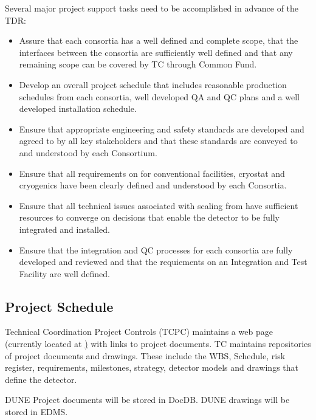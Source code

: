 Several major project support tasks need to be accomplished in advance
of the TDR:
\begin{itemize}
  \item Assure that each consortia has a well defined
and complete scope, that the interfaces between the consortia are
sufficiently well defined and that any remaining scope can be covered
by TC through Common Fund.
  \item Develop an overall project schedule that includes reasonable
production schedules from each consortia, well developed QA and QC
plans and a well developed installation schedule.
  \item Ensure that appropriate engineering and safety standards are
developed and agreed to by all key stakeholders and that these
standards are conveyed to and understood by each Consortium.
  \item Ensure that all  requirements on  for
conventional facilities, cryostat and cryogenics have been clearly
defined and understood by each Consortia.
  \item Ensure that all technical issues associated with scaling from
 have sufficient resources to converge on decisions that
enable the detector to be fully integrated and installed.
  \item Ensure that the integration and QC processes for each
consortia are fully developed and reviewed and that the requiements on
an Integration and Test Facility are well defined.
\end{itemize}

\subsection{Project Schedule}
\label{sec:fdsp-coord-controls}

Technical Coordination Project Controls (TCPC) maintains a web page
(currently located at
\href{https://web.fnal.gov/collaboration/DUNE/DUNE\%20Project/\_layouts/15/start.aspx\#/})
with links to project documents. TC maintains repositories of project
documents and drawings. These include the WBS, Schedule, risk
register, requirements, milestones, strategy, detector models and
drawings that define the  detector.

DUNE Project documents will be stored in DocDB. DUNE drawings will be stored in EDMS.

